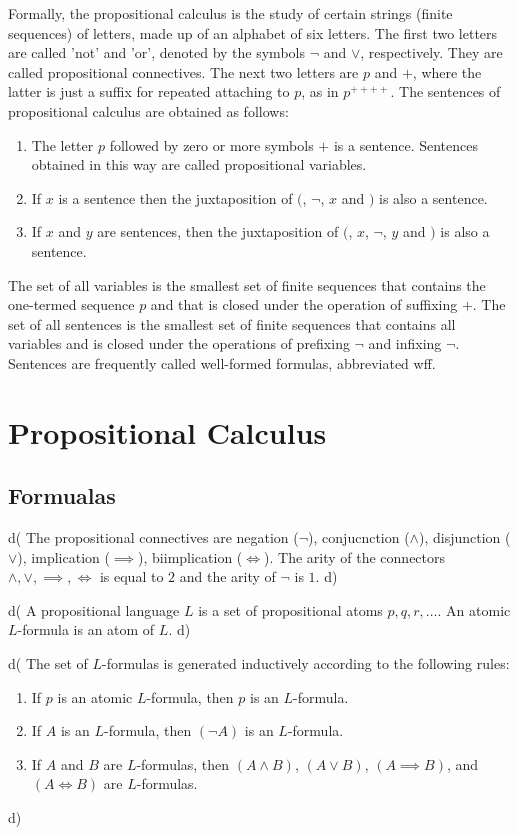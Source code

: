 \documentclass[letterpaper, 10pt]{article}
\theoremstyle{definition}
\theoremstyle{definition}
\begin{document}
Formally, the propositional calculus is the study of certain strings (finite
sequences) of letters, made up of an alphabet of six letters. The first two
letters are called 'not' and 'or', denoted by the symbols $\neg$ and $\lor$,
respectively. They are called propositional connectives. The next two letters
are $p$ and $+$, where the latter is just a suffix for repeated attaching to
$p$, as in $p^{++++}$.
The sentences of propositional calculus are obtained as follows:
\begin{enumerate}
	\item The letter $p$ followed by zero or more symbols $+$ is a sentence.
		Sentences obtained in this way are called propositional variables.
	\item If $x$ is a sentence then the juxtaposition of $($, $\neg$, $x$ and
		$)$ is also
		a sentence.
	\item If $x$ and $y$ are sentences, then the juxtaposition of $($, $x$,
$\lnot$, $y$ and $)$ is also a sentence.  
\end{enumerate}

The set of all variables is the smallest set of finite sequences that contains
the one-termed sequence $p$ and that is closed under the operation of suffixing
$+$. The set of all sentences is the smallest set of finite sequences that
contains all variables and is closed under the operations of prefixing $\neg$
and infixing $\lnot$. Sentences are frequently called well-formed formulas,
abbreviated wff.

\section{Propositional Calculus}
\subsection{Formualas}
d(
The propositional connectives are negation ($\neg$), conjucnction ($\land$),
disjunction ($\lor$), implication ($\implies$), biimplication ($\iff$). The
arity of the connectors $\land, \lor, \implies, \iff$ is equal to $2$ and the
arity of $\neg$ is $1$.
d)

d(
A propositional language $L$ is a set of propositional atoms $p,q,r,\ldots$. An
atomic $L$-formula is an atom of $L$.
d)

d(
The set of $L$-formulas is generated inductively according to the following
rules:
\begin{enumerate}
	\item If $p$ is an atomic $L$-formula, then $p$ is an $L$-formula.
	\item If $A$ is an $L$-formula, then $(\neg A)$ is an $L$-formula.
	\item If $A$ and $B$ are $L$-formulas, then $(A \land B)$, $(A \lor B)$, $(A
		\implies B)$, and $(A \iff B)$ are $L$-formulas.
\end{enumerate}
d)
\end{document}
